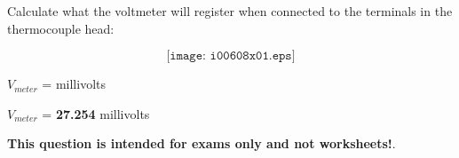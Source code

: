 

Calculate what the voltmeter will register when connected to the terminals in the thermocouple head:

$$\texttt{[image: i00608x01.eps]}$$

$V_{meter}$ = \underbar{\hskip 50pt} millivolts







$V_{meter}$ = {\bf 27.254} millivolts







{\bf This question is intended for exams only and not worksheets!}.


